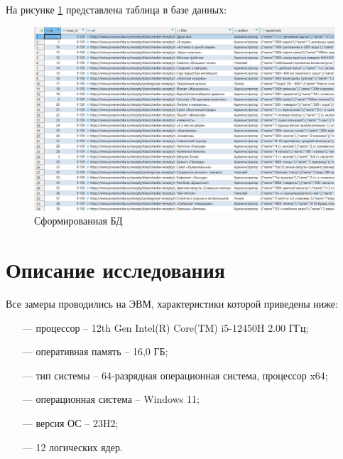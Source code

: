 \documentclass[a4paper, 12pt]{extreport}
\begin{document}
На рисунке \ref{pic:db} представлена таблица в базе данных:
\begin{figure}[h]
	\centering
	\includegraphics[scale=0.5]{tools/db.png}
	\caption{Сформированная БД}
	\label{pic:db}
\end{figure}

\chapter{Описание исследования}

Все замеры проводились на ЭВМ, характеристики которой приведены ниже:
\begin{itemize}
	\item[---] процессор -- 12th Gen Intel(R) Core(TM) i5-12450H   2.00 ГГц;
	\item[---] оперативная память -- 16,0 ГБ;
	\item[---] тип системы -- 64-разрядная операционная система, процессор x64;
	\item[---] операционная система -- Windows 11;
	\item[---] версия ОС -- 23H2;
	\item[---] 12 логических ядер.
\end{itemize}
\end{document}
